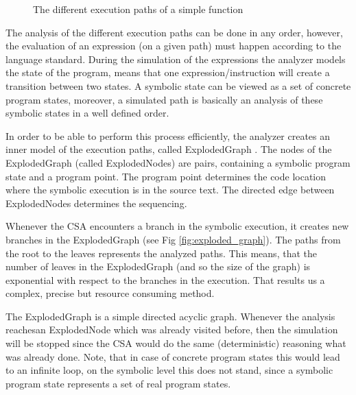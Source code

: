 \begin{figure}[h]
	\centering
	\caption{The different execution paths of a simple function}
	\label{fig:exec_path}
\end{figure}

The analysis of the different execution paths can be done in any order, 
however, the evaluation of an expression (on a given path) must happen 
according to the language standard.  
During the simulation of the expressions the analyzer models the state of the 
program, means that one expression/instruction will create a transition between 
two states. A symbolic state can be viewed as a set of concrete program states, 
moreover, a simulated path is basically an analysis of these symbolic states in 
a well defined order. 

In order to be able to perform this process efficiently, the analyzer creates 
an inner model of the execution paths, called ExplodedGraph 
\cite{explodedgraph}. The nodes of the ExplodedGraph (called ExplodedNodes) are 
pairs, containing a symbolic program state and a program point. The program 
point determines the code location where the symbolic execution is in the 
source text. The directed edge between ExplodedNodes determines the sequencing.

Whenever the CSA encounters a branch in the symbolic execution, it creates new 
branches in the ExplodedGraph (see Fig \ref{fig:exploded_graph}). The paths
from the root to the leaves represents the analyzed paths. This means, that the 
number of leaves in the ExplodedGraph (and so the size of the graph) is 
exponential with respect to the branches in the execution. That results us a 
complex, precise but resource consuming method.

The ExplodedGraph is a simple directed acyclic graph. Whenever the analysis 
reachesan ExplodedNode which was already visited before, then the simulation 
will be stopped since the CSA would do the same (deterministic) reasoning what 
was already done. Note, that in case of concrete program states this would lead 
to an infinite loop, on the symbolic level this does not stand, since a
symbolic program state represents a set of real program states.

